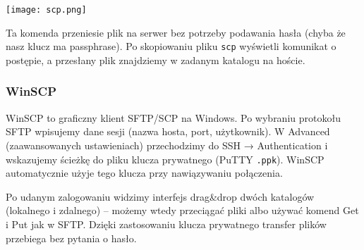 \documentclass{article}
\begin{document}
\begin{multicols}{2}
\noindent
\texttt{[image: scp.png]}

Ta komenda przeniesie plik na serwer bez potrzeby podawania hasła (chyba że nasz klucz ma passphrase). Po skopiowaniu pliku \verb|scp| wyświetli komunikat o postępie, a przesłany plik znajdziemy w zadanym katalogu na hoście.

\subsubsection{WinSCP}
WinSCP to graficzny klient SFTP/SCP na Windows. Po wybraniu protokołu SFTP wpisujemy dane sesji (nazwa hosta, port, użytkownik). W Advanced (zaawansowanych ustawieniach) przechodzimy do SSH → Authentication i wskazujemy ścieżkę do pliku klucza prywatnego (PuTTY \verb|.ppk|)\cite{superuser}. WinSCP automatycznie użyje tego klucza przy nawiązywaniu połączenia. 

Po udanym zalogowaniu widzimy interfejs drag\&drop dwóch katalogów (lokalnego i zdalnego) – możemy wtedy przeciągać pliki albo używać komend Get i Put jak w SFTP. Dzięki zastosowaniu klucza prywatnego transfer plików przebiega bez pytania o hasło. 

\end{multicols}
\end{document}
